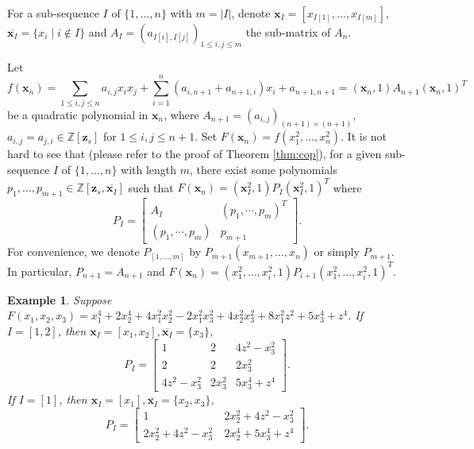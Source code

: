 \documentclass[amsthm]{elsart}
\def \ZZ {{\mathbb Z}}
\newcommand{\xx}{\bm{x}}
\newcommand{\zz}{\bm{z}}
\newtheorem{ex}{Example}   \renewcommand{\algorithmicrequire}{\textsf{Input:}}
\begin{document}
For a sub-sequence $I$ of $\{1,\dots, n\}$ with $m=|I|$, denote $\xx_I=[x_{I[1]},\ldots,x_{I[m]}]$, $\overline{\xx_I}=\{x_i\mid i\not\in I\}$ and
$A_I=(a_{{I[i],I[j]}})_{1\le i,j\le m}$ the sub-matrix of $A_{n}$.

Let \begin{equation}\label{eq:f}
      f(\xx_n) =\sum_{1\le i,j\le n} a_{i,j}x_ix_j+\sum_{i=1}^n (a_{i,n+1}+a_{n+1,i})x_i+a_{n+1,n+1}=(\xx_n,1)A_{n+1}(\xx_n,1)^T
    \end{equation}
be a quadratic polynomial in $\xx_n$, where $A_{n+1}=(a_{i,j})_{(n+1)\times(n+1)}$, $a_{i,j}=a_{j,i}\in \ZZ[\zz_s]$ for $1\le i,j\le n+1$. Set $F(\xx_n)=f(x_1^2,\ldots,x_n^2)$. It is not hard to see that (please refer to the proof of Theorem \ref{thm:cop}), for a given sub-sequence $I$ of $\{1,\dots, n\}$ with length $m$,  there exist some polynomials $p_1,\ldots,p_{m+1}\in \ZZ[\zz_s,\overline{\xx_I}]$ such that $F(\xx_n)=(\xx_I^2,1)P_I(\xx_I^2,1)^T$ where
  $$P_I=\begin{bmatrix} A_I & (p_{1}, \cdots , p_{m})^T \\ (p_{1}, \cdots , p_{m}) & p_{m+1} \end{bmatrix}.$$
For convenience, we denote $P_{[1,\dots,m]}$ by $P_{m+1}(x_{m+1},\ldots,x_n)$ or simply $P_{m+1}$. In particular, $P_{n+1}=A_{n+1}$ and $F(\xx_n)=(x_1^2,\ldots, x_i^2,1)P_{i+1}(x_1^2,\ldots,x_i^2,1)^T$.
\begin{ex}
  Suppose $F(x_1,x_2,x_3)=x_1^4+2x_2^4+4x_1^2x_2^2-2x_1^2x_3^2+4x_2^2x_3^2+8x_1^2z^2+5x_3^4+z^4$. If $I=[1,2]$, then $\xx_I=[x_1,x_2],\overline{\xx_I}=\{x_3\}$,
  $$P_I=\begin{bmatrix} 1 & 2 & 4z^2-x_3^2\\
    2 & 2 &        2x_3^2 \\
    4z^2-x_3^2 & 2x_3^2 & 5x_3^4+ z^4  \end{bmatrix}.$$
  If $I=[1]$, then
  $\xx_I=[x_1],\overline{\xx_I}=\{x_2,x_3\}$,
  $$P_I=\begin{bmatrix} 1 &\   2x_2^2+4z^2-x_3^2\\
    2x_2^2+4z^2-x_3^2 & \  2x_2^4+5x_3^4+ z^4  \end{bmatrix}.$$
\end{ex}
\end{document}
